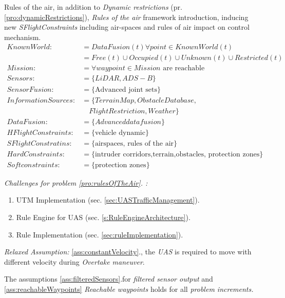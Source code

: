 \begin{problem}{Rules of the air}\label{pro:rulesOfTheAir}, 
    in addition to \emph{Dynamic restrictions} (pr. \ref{pro:dynamicRestrictions}), \emph{Rules of the air} framework introduction, inducing new \emph{SFlightConstraints} including air-spaces and rules of air impact on control mechanism.
    \begin{equation}\label{eq:rulesOfTheAir}
        \begin{aligned}
            KnownWorld:&= DataFusion(t)\forall point\in KnownWorld(t)\\
                       &=Free(t) \cup Occupied(t) \cup Unknown(t) \cup Restricted(t)\\
            Mission:&= \forall waypoint\in Mission \text{ are reachable}\\
            Sensors:&= \{LiDAR,ADS-B\}\\
            SensorFusion:&= \{\text{Advanced joint sets}\}\\
            InformationSources:&=\{Terrain Map,Obstacle Database,\\
                               &\quad Flight Restriction,Weather\}\\
            DataFusion:&= \{Advanced data fusion\}\\
            HFlightConstraints:&=\{\text{vehicle dynamic}\}\\
            SFlightConstratins:&=\{\text{airspaces, rules of the air}\}\\
            HardConstraints:&=\{\text{intruder corridors,terrain,obstacles, protection zones}\}\\
            Softconstraints:&=\{\text{protection zones}\}
        \end{aligned}
    \end{equation}
    
    \noindent \emph{Challenges for problem  \ref{pro:rulesOfTheAir}. :}
    \begin{enumerate}
        \item UTM Implementation (sec. \ref{sec:UASTrafficManagement}).
        \item Rule Engine for UAS (sec. \ref{s:RuleEngineArchitecture}).
        \item Rule Implementation (sec. \ref{sec:ruleImplementation}).
    \end{enumerate}
    
    \noindent \emph{Relaxed Assumption: } \ref{ass:constantVelocity}., the \emph{UAS} is required to move with different velocity during \emph{Overtake maneuver}.
\end{problem}

\begin{note}
    The assumptions \ref{ass:filteredSensors}.for \emph{filtered sensor output} and \ref{ass:reachableWaypoints} \emph{Reachable waypoints} holds for all  \emph{problem increments.}
\end{note}